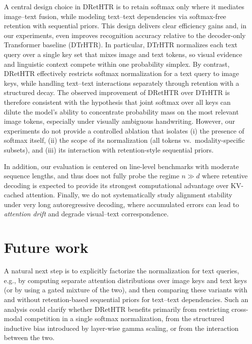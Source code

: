 \documentclass[times, review, 10pt]{elsarticle}
\begin{document}
A central design choice in DRetHTR is to retain softmax only where it mediates image--text fusion, while modeling text--text dependencies via softmax-free retention with sequential priors. This design delivers clear efficiency gains and, in our experiments, even improves recognition accuracy relative to the decoder-only Transformer baseline (DTrHTR). In particular, DTrHTR normalizes each text query over a single key set that mixes image and text tokens, so visual evidence and linguistic context compete within one probability simplex. By contrast, DRetHTR effectively restricts softmax normalization for a text query to image keys, while handling text--text interactions separately through retention with a structured decay. The observed improvement of DRetHTR over DTrHTR is therefore consistent with the hypothesis that joint softmax over all keys can dilute the model’s ability to concentrate probability mass on the most relevant image tokens, especially under visually ambiguous handwriting. However, our experiments do not provide a controlled ablation that isolates (i) the presence of softmax itself, (ii) the scope of its normalization (all tokens vs.\ modality-specific subsets), and (iii) its interaction with retention-style sequential priors.

In addition, our evaluation is centered on line-level benchmarks with moderate sequence lengths, and thus does not fully probe the regime $n \gg d$ where retentive decoding is expected to provide its strongest computational advantage over KV-cached attention. Finally, we do not systematically study alignment stability under very long autoregressive decoding, where accumulated errors can lead to \emph{attention drift} and degrade visual--text correspondence.

\section{Future work}
\label{sec:future}

A natural next step is to explicitly factorize the normalization for text queries, e.g., by computing separate attention distributions over image keys and text keys (or by using a gated mixture of the two), and then comparing these variants with and without retention-based sequential priors for text--text dependencies. Such an analysis could clarify whether DRetHTR benefits primarily from restricting cross-modal competition in a single softmax normalization, from the structured inductive bias introduced by layer-wise gamma scaling, or from the interaction between the two.
\end{document}
